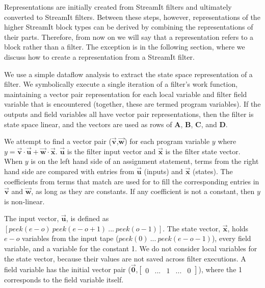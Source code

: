 Representations are initially created from StreamIt filters and
ultimately converted to StreamIt filters. Between these steps,
however, representations of the higher StreamIt block types can be
derived by combining the representations of their parts.  Therefore,
from now on we will say that a representation refers to a block rather
than a filter. The exception is in the following section, where we
discuss how to create a representation from a StreamIt filter.


We use a simple dataflow analysis to extract the state space
representation of a filter. We symbolically execute a single iteration
of a filter's work function, maintaining a vector pair representation
for each local variable and filter field variable that is encountered
(together, these are termed program variables). If the outputs and
field variables all have vector pair representations, then the filter
is state space linear, and the vectors are used as rows of
$\mathbf{A}$, $\mathbf{B}$, $\mathbf{C}$, and $\mathbf{D}$.

We attempt to find a vector pair
($\vec{\mathbf{v}}$,$\vec{\mathbf{w}}$) for each program variable $y$
where $y = \vec{\mathbf{v}} \cdot \vec{\mathbf{u}} +
\vec{\mathbf{w}} \cdot \vec{\mathbf{x}}$. $\vec{\mathbf{u}}$ is
the filter input vector and $\vec{\mathbf{x}}$ is the filter state
vector. When $y$ is on the left hand side of an assignment
statement, terms from the right hand side are compared with
entries from $\vec{\mathbf{u}}$ (inputs) and $\vec{\mathbf{x}}$
(states). The coefficients from terms that match are used for to
fill the corresponding entries in $\vec{\mathbf{v}}$ and
$\vec{\mathbf{w}}$, as long as they are constants. If any
coefficient is not a constant, then $y$ is non-linear.

The input vector, $\vec{\mathbf{u}}$, is defined as $[peek(e-o)
~peek(e-o+1) ~... ~peek(o-1)]$. The state vector,
$\vec{\mathbf{x}}$, holds $e-o$ variables from the input tape
($peek(0) ~... ~peek(e-o-1)$), every field variable, and a
variable for the constant 1. We do not consider local variables
for the state vector, because their values are not saved across
filter executions. 
A field variable has the initial vector
pair ($\vec{\mathbf{0}}$,$\left [
\begin{array} {ccccc} 0 & ... & 1 & ... & 0 \end{array} \right
]$), where the 1 corresponds to the field variable itself.

